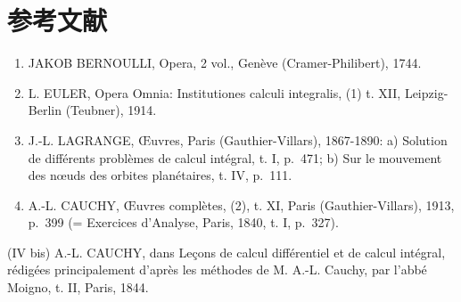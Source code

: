 \section*{参考文献}
{}

\begin{enumerate}
\def\labelenumi{(\Roman{enumi})}
\item
  JAKOB BERNOULLI, Opera, 2 vol., Genève (Cramer-Philibert), 1744.
\item
  L. EULER, Opera Omnia: Institutiones calculi integralis, (1) t. XII, Leipzig-Berlin (Teubner), 1914.
\item
  J.-L. LAGRANGE, Œuvres, Paris (Gauthier-Villars), 1867-1890: a) Solution de différents problèmes de calcul intégral, t. I, p.~471; b) Sur le mouvement des nœuds des orbites planétaires, t. IV, p.~111.
\item
  A.-L. CAUCHY, Œuvres complètes, (2), t. XI, Paris (Gauthier-Villars), 1913, p.~399 (= Exercices d'Analyse, Paris, 1840, t. I, p.~327).
\end{enumerate}

(IV bis) A.-L. CAUCHY, dans Leçons de calcul différentiel et de calcul intégral, rédigées principalement d'après les méthodes de M. A.-L. Cauchy, par l'abbé Moigno, t. II, Paris, 1844.

